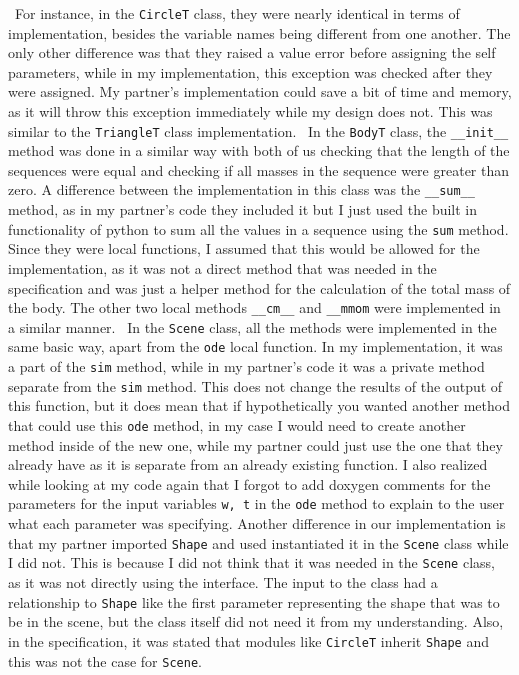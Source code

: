 \documentclass[12pt]{article}
\begin{document}
~\newline\noindent For instance, in the \verb|CircleT| class, they were nearly identical in terms
of implementation, besides the variable names being different from one another. The only other 
difference was that they raised a value error before assigning the self parameters, while in my 
implementation, this exception was checked after they were assigned. My partner's implementation 
could save a bit of time and memory, as it will throw this exception immediately while my design 
does not. This was similar to the \verb|TriangleT| class implementation. 
~\newline\noindent In the \verb|BodyT| class, the \verb|__init__| method was done in a similar 
way with both of us checking that the length of the sequences were equal and checking if all 
masses in the sequence were greater than zero. A difference between the implementation in this 
class was the \verb|__sum__| method, as in my partner's code they included it but I just used the
built in functionality of python to sum all the values in a sequence using the \verb|sum| method.
Since they were local functions, I assumed that this would be allowed for the implementation, as 
it was not a direct method that was needed in the specification and was just a helper method for 
the calculation of the total mass of the body. The other two local methods \verb|__cm__| and 
\verb|__mmom| were implemented in a similar manner. 
~\newline\noindent In the \verb|Scene| class, all the methods were implemented in the same basic
way, apart from the \verb|ode| local function. In my implementation, it was a part of the 
\verb|sim| method, while in my partner's code it was a private method separate from the 
\verb|sim| method. This does not change the results of the output of this function, but it does
mean that if hypothetically you wanted another method that could use this \verb|ode| method, in 
my case I would need to create another method inside of the new one, while my partner could just
use the one that they already have as it is separate from an already existing function. I also 
realized while looking at my code again that I forgot to add doxygen comments for the parameters 
for the input variables \verb|w, t| in the \verb|ode| method to explain to the user what each 
parameter was specifying. Another difference in our implementation is that my partner imported 
\verb|Shape| and used instantiated it in the \verb|Scene| class while I did not. This is because 
I did not think that it was needed in the \verb|Scene| class, as it was not directly using the 
interface. The input to the class had a relationship to \verb|Shape| like the first parameter 
representing the shape that was to be in the scene, but the class itself did not need it from my 
understanding. Also, in the specification, it was stated that modules like \verb|CircleT| inherit 
\verb|Shape| and this was not the case for \verb|Scene|. 
\end{document}
